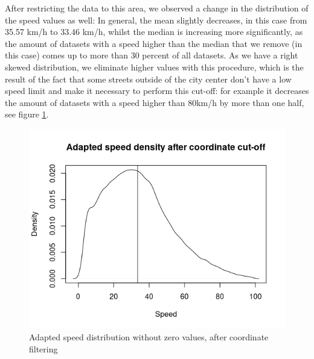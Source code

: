 \documentclass[11pt,conference,a4paper,twocolumns,romanappendices]{IEEEtran}
\begin{document}
After restricting the data to this area, we observed a change in the distribution of the speed values as well: In general, the mean slightly decreases, in this case from 35.57 km/h to 33.46 km/h, whilst the median is increasing more significantly, as the amount of datasets with a speed higher than the median that we remove (in this case) comes up to more than 30 percent of all datasets. As we have a right skewed distribution, we eliminate higher values with this procedure, which is the result of the fact that some streets outside of the city center don't have a low speed limit and make it necessary to perform this cut-off: for example it decreases the amount of datasets with a speed higher than 80km/h by more than one half, see figure \ref{fig:speed_after}. \\

\begin{figure}[h]
\centering
\includegraphics[scale=0.6]{density_after.png}
\caption{\label{fig:speed_after}Adapted speed distribution without zero values, after coordinate filtering}
\end{figure}
\end{document}
